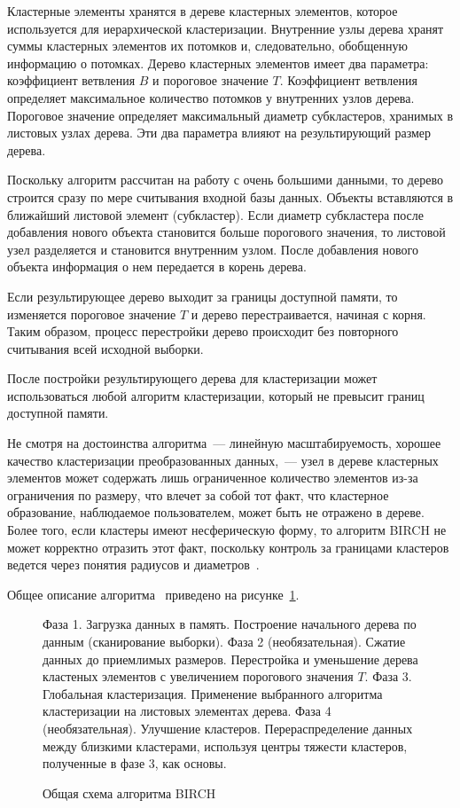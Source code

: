 Кластерные элементы хранятся в дереве кластерных элементов, которое используется для иерархической кластеризации. Внутренние узлы дерева хранят суммы кластерных элементов их потомков и, следовательно, обобщенную информацию о потомках. Дерево кластерных элементов имеет два параметра: коэффициент ветвления \( B \) и пороговое значение \( T \). Коэффициент ветвления определяет максимальное количество потомков у внутренних узлов дерева. Пороговое значение определяет максимальный диаметр субкластеров, хранимых в листовых узлах дерева. Эти два параметра влияют на результирующий размер дерева.

Поскольку алгоритм рассчитан на работу с очень большими данными, то дерево строится сразу по мере считывания входной базы данных. Объекты вставляются в ближайший листовой элемент (субкластер). Если диаметр субкластера после добавления нового объекта становится больше порогового значения, то листовой узел разделяется и становится внутренним узлом. После добавления нового объекта информация о нем передается в корень дерева.

Если результирующее дерево выходит за границы доступной памяти, то изменяется пороговое значение \( T \) и дерево перестраивается, начиная с корня. Таким образом, процесс перестройки дерево происходит без повторного считывания всей исходной выборки.

После постройки результирующего дерева для кластеризации может использоваться любой алгоритм кластеризации, который не превысит границ доступной памяти.

Не смотря на достоинства алгоритма~--- линейную масштабируемость, хорошее качество кластеризации преобразованных данных,~--- узел в дереве кластерных элементов может содержать лишь ограниченное количество элементов из-за ограничения по размеру, что влечет за собой тот факт, что кластерное образование, наблюдаемое пользователем, может быть не отражено в дереве. Более того, если кластеры имеют несферическую форму, то алгоритм BIRCH не может корректно отразить этот факт, поскольку контроль за границами кластеров ведется через понятия радиусов и диаметров~\cite{cod, birch}.

Общее описание алгоритма~\cite[с.~2]{neiskiy} приведено на рисунке~\ref{alg:birch}.

\begin{figure}[ht!]
    \begin{algorithm}[H]
        \DontPrintSemicolon
        Фаза 1. Загрузка данных в память.\;
        Построение начального дерева по данным (сканирование выборки).\;
        Фаза 2 (необязательная). Сжатие данных до приемлимых размеров.\;
        Перестройка и уменьшение дерева кластеных элементов с увеличением порогового значения \( T \).\;
        Фаза 3. Глобальная кластеризация.\;
        Применение выбранного алгоритма кластеризации на листовых элементах дерева.\;
        Фаза 4 (необязательная). Улучшение кластеров.\;
        Перераспределение данных между близкими кластерами, используя центры тяжести кластеров, полученные в фазе 3, как основы.\;
    \end{algorithm}
    \vspace*{-1.5em}
    \caption{Общая схема алгоритма BIRCH}
    \label{alg:birch}
\end{figure}

